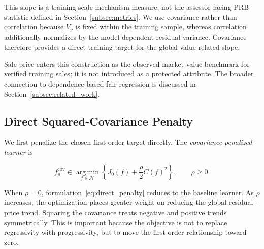 \documentclass[10pt]{article}
\theoremstyle{definition}
\newcommand{\1}{\mathbf{1}}
\newcommand{\Hcal}{\mathcal{H}}
\newcommand{\argminop}{\operatorname*{arg\,min}}
\begin{document}
{This slope is a training-scale mechanism measure, not the assessor-facing PRB statistic defined in Section~\ref{subsec:metrics}. We use covariance rather than correlation because $V_y$ is fixed within the training sample, whereas correlation additionally normalizes by the model-dependent residual variance. Covariance therefore provides a direct training target for the global value-related slope.}

{Sale price enters this construction as the observed market-value benchmark for verified training sales; it is not introduced as a protected attribute. The broader connection to dependence-based fair regression is discussed in Section~\ref{subsec:related_work}.}


\subsection{{Direct Squared-Covariance Penalty}}
\label{subsec:direct_penalty}

{We first penalize the chosen first-order target directly. The \emph{covariance-penalized learner} is}


{
\begin{equation}
\label{eq:direct_penalty}
f_\rho^{\mathrm{cov}}
\in
\argminop_{f\in\Hcal}
\left\{
J_0(f)+\frac{\rho}{2}C(f)^2
\right\},
\qquad
\rho\geq 0.
\end{equation}
}

When $\rho=0$, formulation~\eqref{eq:direct_penalty} reduces to the baseline learner. As $\rho$ increases, the optimization places greater weight on reducing the global residual--price trend. Squaring the covariance treats negative and positive trends symmetrically. This is important because the objective is not to replace regressivity with progressivity, but to move the first-order relationship toward zero.

\end{document}
